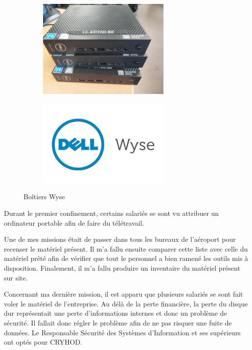 \begin{figure}[hbt!]
  \begin{subfigure}{0.5\textwidth}
    \centering
    \includegraphics[width=6.5cm]{Images/wyse.jpg}  
    \label{fig:wyse}
  \end{subfigure}
  \begin{subfigure}{0.5\textwidth}
    \centering
    \includegraphics[width=6.5cm]{Images/wyse_logo.jpg}  
    \label{fig:logowyse}
  \end{subfigure}
  \caption{Boîtiers Wyse}
\end{figure}

Durant le premier confinement, certains salariés se sont vu attribuer un ordinateur portable afin de faire du télétravail.

Une de mes missions était de passer dans tous les bureaux de l’aéroport pour recenser le matériel présent. Il m'a fallu ensuite comparer cette liste avec celle du matériel prêté afin de vérifier que tout le personnel a bien ramené les outils mis à disposition.
Finalement, il m'a fallu produire un inventaire du matériel présent sur site.\newline


Concernant ma dernière mission, il est apparu que plusieurs salariés se sont fait voler le matériel de l'entreprise. Au délà de la perte financière, la perte du disque dur représentait une perte d’informations internes et donc un problème de sécurité. Il fallait donc régler le problème afin de ne pas risquer une fuite de données. Le Responsable Sécurité des Systèmes d’Information et ses supérieurs ont optés pour CRYHOD.


